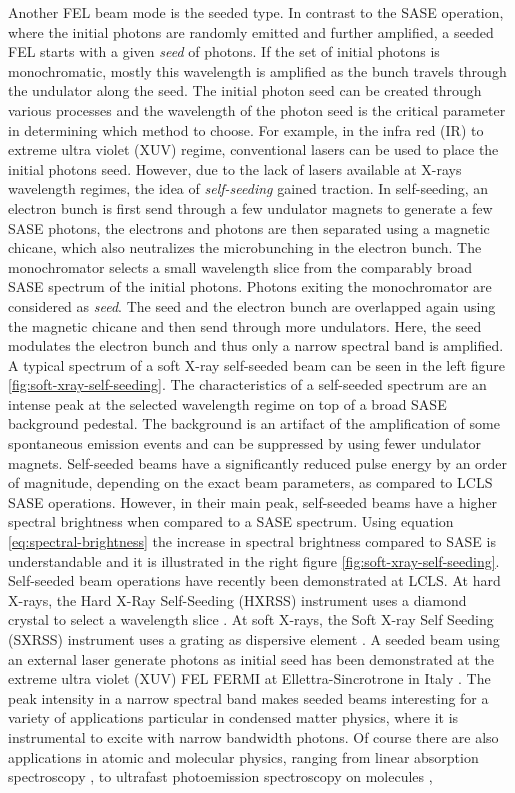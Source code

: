 Another FEL beam mode is the seeded type. In contrast to the SASE operation, where the initial photons are randomly emitted and further amplified, a seeded FEL starts with a given \textit{seed} of photons. If the set of initial photons is monochromatic, mostly this wavelength is amplified as the bunch travels through the undulator along the seed. The initial photon seed can be created through various processes and the wavelength of the photon seed is the critical parameter in determining which method to choose. For example, in the infra red (IR) to extreme ultra violet (XUV) regime, conventional lasers can be used to place the initial photons seed. However, due to the lack of lasers available at X-rays wavelength regimes, the idea of \textit{self-seeding} gained traction. In self-seeding, an electron bunch is first send through a few undulator magnets to generate a few SASE photons, the electrons and photons are then separated using a magnetic chicane, which also neutralizes the microbunching in the electron bunch. The monochromator selects a small wavelength slice from the comparably broad SASE spectrum of the initial photons. Photons exiting the monochromator are considered as \textit{seed}. The seed and the electron bunch are overlapped again using the magnetic chicane and then send through more undulators. Here, the seed modulates the electron bunch and thus only a narrow spectral band is amplified. A typical spectrum of a soft X-ray self-seeded beam can be seen in the left figure \ref{fig:soft-xray-self-seeding}. The characteristics of a self-seeded spectrum are an intense peak at the selected wavelength regime on top of a broad SASE background pedestal. The background is an artifact of the amplification of some spontaneous emission events and can be suppressed by using fewer undulator magnets. Self-seeded beams have a significantly reduced pulse energy by an order of magnitude, depending on the exact beam parameters, as compared to LCLS SASE operations. However, in their main peak, self-seeded beams have a higher spectral brightness when compared to a SASE spectrum. Using equation \ref{eq:spectral-brightness} the increase in spectral brightness compared to SASE is understandable and it is illustrated in the right figure \ref{fig:soft-xray-self-seeding}. Self-seeded beam operations have recently been demonstrated at LCLS. At hard X-rays, the Hard X-Ray Self-Seeding (HXRSS) instrument uses a diamond crystal to select a wavelength slice \citep{Amann-2012-NatPho}. At soft X-rays, the Soft X-ray Self Seeding (SXRSS) instrument uses a grating as dispersive element \citep{Ratner-2015-PRL}. A seeded beam using an external laser generate photons as initial seed has been demonstrated at the extreme ultra violet (XUV) FEL FERMI at Ellettra-Sincrotrone in Italy \citep{Allaria-2012-NatPho}. The peak intensity in a narrow spectral band makes seeded beams interesting for a variety of applications particular in condensed matter physics, where it is instrumental to excite with narrow bandwidth photons. Of course there are also applications in atomic and molecular physics, ranging from linear absorption spectroscopy \citep{Ferguson-2014-Unpublished}, to ultrafast photoemission spectroscopy on molecules \citep{Bucher-2014-Unpublished}, 